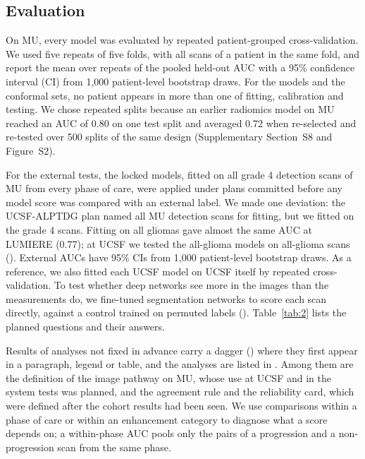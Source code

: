 \documentclass[largeformat]{interact} %
\begin{document}
\subsection{Evaluation}\label{sec:2.3}

On MU, every model was evaluated by repeated patient-grouped cross-validation. We used five repeats of five folds,
with all scans of a patient in the same fold, and report the mean over repeats of the pooled held-out AUC with a 95\%
confidence interval (CI) from 1,000 patient-level bootstrap draws. For the models and the conformal sets, no
patient appears in more than one of fitting, calibration and testing. We chose repeated splits because an earlier radiomics model on MU reached an AUC of
0.80 on one test split and averaged 0.72 when re-selected and re-tested over 500 splits of the same design
(Supplementary Section~S8 and Figure~S2).

For the external tests, the locked models, fitted on all grade 4 detection scans of MU from every phase of care,
were applied under plans committed before any model score was compared with an external label. We made one deviation: the UCSF-ALPTDG plan named all MU detection scans for fitting, but we fitted on the grade 4
scans. Fitting on all gliomas gave almost the same AUC at LUMIERE (0.77); at UCSF we tested the all-glioma models on
all-glioma scans ().
External AUCs have 95\% CIs from 1,000 patient-level bootstrap draws. As a reference, we also fitted each
UCSF model on UCSF itself by repeated cross-validation. To test whether deep networks see more in the images than the
measurements do, we fine-tuned segmentation networks to score each scan directly, against a control trained on
permuted labels (). Table~\ref{tab:2} lists the planned questions and their answers.

Results of analyses not fixed in advance carry a dagger (\textdagger) where they first appear in a paragraph,
legend or table, and the analyses are listed in . Among
them are the definition of the image pathway on MU, whose use at UCSF and in the system tests was planned, and the
agreement rule and the reliability card, which were defined after the cohort results had been seen. We use comparisons within a phase of care or within an enhancement category to diagnose what a score depends on; a
within-phase AUC pools only the pairs of a progression and a non-progression scan from the same phase.
\end{document}
